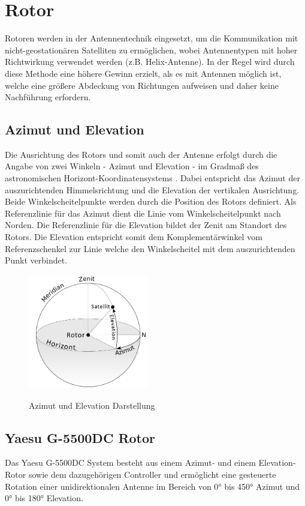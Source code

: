 \chapter{Rotor}
Rotoren werden in der Antennentechnik eingesetzt, um die Kommunikation mit nicht-geostationären Satelliten zu ermöglichen, wobei Antennentypen mit hoher Richtwirkung verwendet werden (z.B. Helix-Antenne). In der Regel wird durch diese Methode eine höhere Gewinn erzielt, als es mit Antennen möglich ist, welche eine größere Abdeckung von Richtungen aufweisen und daher keine Nachführung erfordern. 
\section{Azimut und Elevation}
Die Ausrichtung des Rotors und somit auch der Antenne erfolgt durch die Angabe von zwei Winkeln - Azimut und Elevation - im Gradmaß des astronomischen Horizont-Koordinatensystems \cite{noauthor_astronomische_nodate}. Dabei entspricht das Azimut der auszurichtenden Himmelsrichtung und die Elevation der vertikalen Ausrichtung. Beide Winkelscheitelpunkte werden durch die Position des Rotors definiert. Als Referenzlinie für das Azimut dient die Linie vom Winkelscheitelpunkt nach Norden. Die Referenzlinie für die Elevation bildet der Zenit am Standort des Rotors. Die Elevation entspricht somit dem Komplementärwinkel vom Referenzschenkel zur Linie welche den Winkelscheitel mit dem auszurichtenden Punkt verbindet.

\begin{figure}[H]
	\cite{twcarlson_azimuth_2020}
	\centering
	\includegraphics[width=5.2cm]{../ref/Azimuth-Altitude_schematic_satellit.png}
	\label{fig:Azimut_Elevation_Schematic}
	\caption{Azimut und Elevation Darstellung}
\end{figure}

\section{Yaesu G-5500DC Rotor}
Das Yaesu G-5500DC System \cite{noauthor_yaesu_nodate} besteht aus einem Azimut- und einem Elevation-Rotor sowie dem dazugehörigen Controller und ermöglicht eine gesteuerte Rotation einer unidirektionalen Antenne im Bereich von 0° bis 450° Azimut und 0° bis 180° Elevation.

